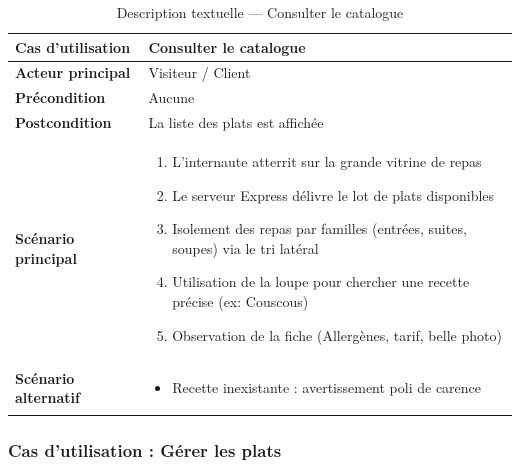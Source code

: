 \begin{table}[H]
    \centering
    \caption{Description textuelle --- Consulter le catalogue}
    \label{tab:desc_consulter_catalogue}
    \renewcommand{\arraystretch}{1.3}
    \begin{tabular}{|p{4cm}|p{8.5cm}|}
        \hline
        \textbf{Cas d'utilisation} & Consulter le catalogue \\
        \hline
        \textbf{Acteur principal} & Visiteur / Client \\
        \hline
        \textbf{Précondition} & Aucune \\
        \hline
        \textbf{Postcondition} & La liste des plats est affichée \\
        \hline
        \textbf{Scénario principal} &
        \begin{enumerate}
            \item L'internaute atterrit sur la grande vitrine de repas
            \item Le serveur Express délivre le lot de plats disponibles
            \item Isolement des repas par familles (entrées, suites, soupes) via le tri latéral
            \item Utilisation de la loupe pour chercher une recette précise (ex: Couscous)
            \item Observation de la fiche (Allergènes, tarif, belle photo)
        \end{enumerate} \\
        \hline
        \textbf{Scénario alternatif} &
        \begin{itemize}
            \item[4a.] Recette inexistante : avertissement poli de carence
        \end{itemize} \\
        \hline
    \end{tabular}
\end{table}

\subsubsection{Cas d'utilisation : Gérer les plats}

